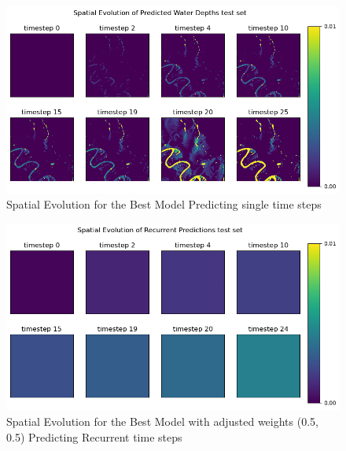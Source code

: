 \begin{figure}[tbph]
	\centering
	\includegraphics[width=0.8\linewidth, height=0.3\textheight]{Figures/Results/Final_Results/Best_Model_SS_SS_test_set}
	\caption[Spatial Single Time step Predictions]{Spatial Evolution for the Best Model Predicting single time steps}
	\label{fig:BMS-spatial}
\end{figure}
\begin{figure}[tbph]
	\centering
	\includegraphics[width=0.8\linewidth, height=0.3\textheight]{Figures/Results/Final_Results/Best_SS_adjusted_weights(5,5)_spatial}
	\caption[Best Model with adjusted weights Spatial recurrent time step Predictions]{Spatial Evolution for the Best Model with adjusted weights (0.5, 0.5) Predicting Recurrent time steps}
	\label{fig:adjusted-spatial}
\end{figure}
